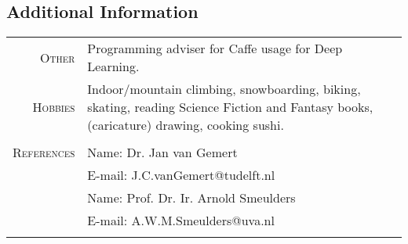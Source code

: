 \documentclass[a4paper, oneside, final]{scrartcl}
\begin{document}
\begin{center}
		\section{Additional Information}
		\begin{tabular}{r@{\hskip 0.3in}p{11.3cm}}
			\textsc{Other}   & Programming adviser for Caffe usage for Deep Learning.\\
			\textsc{Hobbies} & Indoor\slash mountain climbing, snowboarding, biking, skating, reading Science Fiction and Fantasy books, 
				(caricature) drawing, cooking sushi.\\					 
			\multicolumn{2}{c}{}\\

			\textsc{References} & Name: Dr. Jan van Gemert\\
							& E-mail: J.C.vanGemert@tudelft.nl\\[5px]	
				            & Name: Prof. Dr. Ir. Arnold Smeulders\\
				            & E-mail: A.W.M.Smeulders@uva.nl\\
			\multicolumn{2}{c}{}\\
		\end{tabular}
	\end{center}
\end{document}
